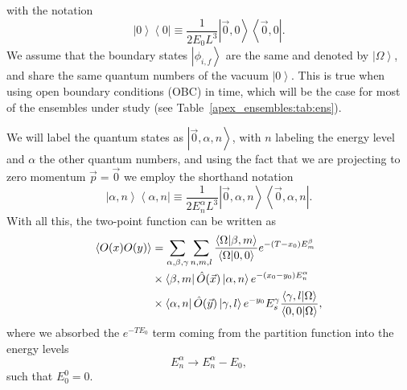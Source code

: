 with the notation
\begin{equation}
\left|0\right>\left<0\right|\equiv\frac{1}{2E_0L^3}\left|\vec{0},0\right>\left<\vec{0},0\right|.
\end{equation}
We assume that the boundary states $\left|\phi_{i,f}\right>$ are the same and denoted by $\left|\Omega\right>$, and share the same quantum numbers of the vacuum $\left|0\right>$. This is true when using open boundary conditions (OBC) in time, which will be the case for most of the ensembles under study (see Table~\ref{apex_ensembles:tab:ens}).

We will label the quantum states as $\left|\vec{0},\alpha,n\right>$, with $n$ labeling the energy level and $\alpha$ the other quantum numbers, and using the fact that we are projecting to zero momentum $\vec{p}=\vec{0}$ we employ the shorthand notation 
\begin{equation}
\left|\alpha,n\right>\left<\alpha,n\right|\equiv\frac{1}{2E_n^{\alpha}L^3}\left|\vec{0},\alpha,n\right>\left<\vec{0},\alpha,n\right|.
\end{equation}
With all this, the two-point function can be written as
\begin{align}
\left<O(x)O(y)\right>&=\sum_{\alpha,\beta,\gamma}\sum_{n,m,l}\frac{\left<\Omega|\beta,m\right>}{\left<\Omega|0,0\right>}e^{-(T-x_0)E_m^{\beta}} \notag \\
&\times\left<\beta,m\right|\hat{O}(\vec{x})\left|\alpha,n\right>e^{-(x_0-y_0)E_n^{\alpha}} \notag \\
&\times\left<\alpha,n\right|\hat{O}(\vec{y})\left|\gamma,l\right>e^{-y_0}E_s^{\gamma}\frac{\left<\gamma,l|\Omega\right>}{\left<0,0|\Omega\right>},
\end{align}
where we absorbed the $e^{-TE_0}$ term coming from the partition function into the energy levels
\begin{equation}
E_n^{\alpha}\rightarrow E_n^{\alpha}-E_0,
\end{equation}
such that $E_0^0=0$.

